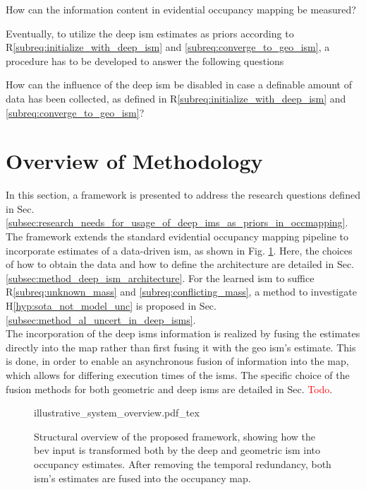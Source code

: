 \begin{requ} \label{requ:how_to_meas_info}
	How can the information content in evidential occupancy mapping be measured?
\end{requ}
Eventually, to utilize the deep \gls{ism} estimates as priors according to R\ref{subreq:initialize_with_deep_ism} and \ref{subreq:converge_to_geo_ism}, a procedure has to be developed to answer the following questions
\begin{requ} \label{requ:disable_deep_ism_influence}
	How can the influence of the deep \gls{ism} be disabled in case a definable amount of data has been collected, as defined in R\ref{subreq:initialize_with_deep_ism} and \ref{subreq:converge_to_geo_ism}?
\end{requ}
%
\section{Overview of Methodology}
\label{sec:framework_overview}
In this section, a framework is presented to address the research questions defined in Sec. \ref{subsec:research_needs_for_usage_of_deep_ims_as_priors_in_occmapping}. The framework extends the standard evidential occupancy mapping pipeline \cite{pagac1996evidential} to incorporate estimates of a data-driven \gls{ism}, as shown in Fig. \ref{fig:illustrative_system_overview}. Here, the choices of how to obtain the data and how to define the architecture are detailed in Sec. \ref{subsec:method_deep_ism_architecture}. For the learned \gls{ism} to suffice R\ref{subreq:unknown_mass} and \ref{subreq:conflicting_mass}, a method to investigate H\ref{hyp:sota_not_model_unc} is proposed in Sec. \ref{subsec:method_al_uncert_in_deep_isms}.\\
The incorporation of the deep \gls{ism}s information is realized by fusing the estimates directly into the map rather than first fusing it with the geo \gls{ism}'s estimate. This is done, in order to enable an asynchronous fusion of information into the map, which allows for differing execution times of the \gls{ism}s. The specific choice of the fusion methods for both geometric and deep \gls{ism}s are detailed in Sec. \textcolor{red}{Todo}.
\begin{figure}
	\begin{center}
		{illustrative_system_overview.pdf_tex}
		\caption{\label{fig:illustrative_system_overview}Structural overview of the proposed framework, showing how the \gls{bev} input is transformed both by the deep and geometric \gls{ism} into occupancy estimates. After removing the temporal redundancy, both \gls{ism}'s estimates are fused into the occupancy map.}
	\end{center}
\end{figure} 
%
